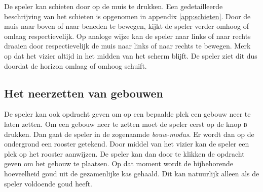     De speler kan schieten door op de muis te drukken. Een gedetailleerde beschrijving van het schieten is opgenomen in appendix \ref{app:schieten}. Door de muis naar boven of naar beneden te bewegen, kijkt de speler verder omhoog of omlaag respectievelijk. Op analoge wijze kan de speler naar links of naar rechts draaien door respectievelijk de muis naar links of naar rechts te bewegen. Merk op dat het vizier altijd in het midden van het scherm blijft. De speler ziet dit dus doordat de horizon omlaag of omhoog schuift.

    \subsection{Het neerzetten van gebouwen}
    De speler kan ook opdracht geven om op een bepaalde plek een gebouw neer te laten zetten. Om een gebouw neer te zetten moet de speler eerst op de knop \textsc{b} drukken. Dan gaat de speler in de zogenaamde \emph{bouw-modus}. Er wordt dan op de ondergrond een rooster getekend. Door middel van het vizier kan de speler een plek op het rooster aanwijzen. De speler kan dan door te klikken de opdracht geven om het gebouw te plaatsen. Op dat moment wordt de bijbehorende hoeveelheid goud uit de gezamenlijke kas gehaald. Dit kan natuurlijk alleen als de speler voldoende goud heeft.

